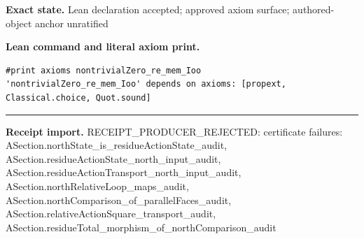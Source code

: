 \documentclass[11pt]{article}
\theoremstyle{plain}
\theoremstyle{definition}
\theoremstyle{remark}
\begin{document}
\begin{tcolorbox}
\par\textbf{Exact state.} Lean declaration accepted; approved axiom surface; authored-object anchor unratified
\par\smallskip\textbf{Lean command and literal axiom print.}
\begin{Verbatim}[breaklines=true,breakanywhere=true,fontsize=\small]
#print axioms nontrivialZero_re_mem_Ioo
'nontrivialZero_re_mem_Ioo' depends on axioms: [propext, Classical.choice, Quot.sound]
\end{Verbatim}
\medskip\hrule\medskip
\textbf{Receipt import.} \textcolor{KgtRed}{RECEIPT\_PRODUCER\_REJECTED: certificate failures: ASection.northState\_is\_residueActionState\_audit, ASection.residueActionState\_north\_input\_audit, ASection.residueActionTransport\_north\_input\_audit, ASection.northRelativeLoop\_maps\_audit, ASection.northComparison\_of\_parallelFaces\_audit, ASection.relativeActionSquare\_transport\_audit, ASection.residueTotal\_morphism\_of\_northComparison\_audit}
\end{tcolorbox}
\medskip
\end{document}
